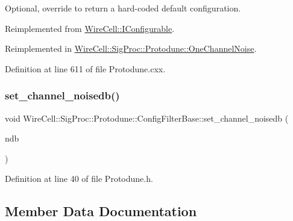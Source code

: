 Optional, override to return a hard-\/coded default configuration. 



Reimplemented from \hyperlink{class_wire_cell_1_1_i_configurable_a54841b2da3d1ea02189478bff96f7998}{Wire\+Cell\+::\+I\+Configurable}.



Reimplemented in \hyperlink{class_wire_cell_1_1_sig_proc_1_1_protodune_1_1_one_channel_noise_a2f0a41f11d154f971da95d9127be594d}{Wire\+Cell\+::\+Sig\+Proc\+::\+Protodune\+::\+One\+Channel\+Noise}.



Definition at line 611 of file Protodune.\+cxx.

\mbox{\label{class_wire_cell_1_1_sig_proc_1_1_protodune_1_1_config_filter_base_a4a6d78e4e3977165a24420463bc32526}} 
\subsubsection{\texorpdfstring{set\+\_\+channel\+\_\+noisedb()}{set\_channel\_noisedb()}}
{\footnotesize\ttfamily void Wire\+Cell\+::\+Sig\+Proc\+::\+Protodune\+::\+Config\+Filter\+Base\+::set\+\_\+channel\+\_\+noisedb (\begin{DoxyParamCaption}\item[{\hyperlink{class_wire_cell_1_1_interface_a09c548fb8266cfa39afb2e74a4615c37}{Wire\+Cell\+::\+I\+Channel\+Noise\+Database\+::pointer}}]{ndb }\end{DoxyParamCaption})\hspace{0.3cm}{\ttfamily [inline]}}



Definition at line 40 of file Protodune.\+h.



\subsection{Member Data Documentation}
\mbox{\label{class_wire_cell_1_1_sig_proc_1_1_protodune_1_1_config_filter_base_a913bad0068f27d0e77626b812be512a9}} 
